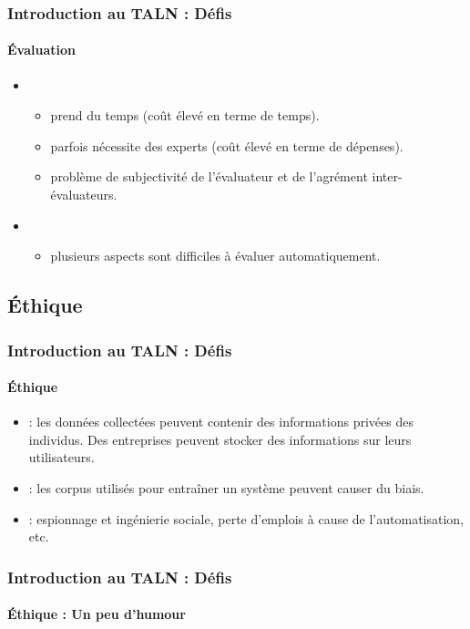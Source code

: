 \documentclass[xcolor=table]{beamer}
\begin{document}
\begin{frame}
\frametitle{Introduction au TALN : Défis}
\framesubtitle{Évaluation}

\begin{itemize}
	\item {}
	\begin{itemize}
		\item prend du temps (coût élevé en terme de temps).
		\item parfois nécessite des experts (coût élevé en terme de dépenses).
		\item problème de subjectivité de l'évaluateur et de l'agrément inter-évaluateurs.
	\end{itemize}
	\item {}
	\begin{itemize}
		\item plusieurs aspects sont difficiles à évaluer automatiquement.
	\end{itemize}
\end{itemize}

\end{frame}

\subsection{Éthique}

\begin{frame}
\frametitle{Introduction au TALN : Défis}
\framesubtitle{Éthique}

\begin{itemize}
	\item {} : les données collectées peuvent contenir des informations privées des individus. Des entreprises peuvent stocker des informations sur leurs utilisateurs. 
	\item {} : les corpus utilisés pour entraîner un système peuvent causer du biais.
	\item {} : espionnage et ingénierie sociale, perte d'emplois à cause de l'automatisation, etc.
\end{itemize}

\end{frame}

\begin{frame}
\frametitle{Introduction au TALN : Défis}
\framesubtitle{Éthique : Un peu d'humour}

\begin{center}
\end{center}

\end{frame}

\end{document}
